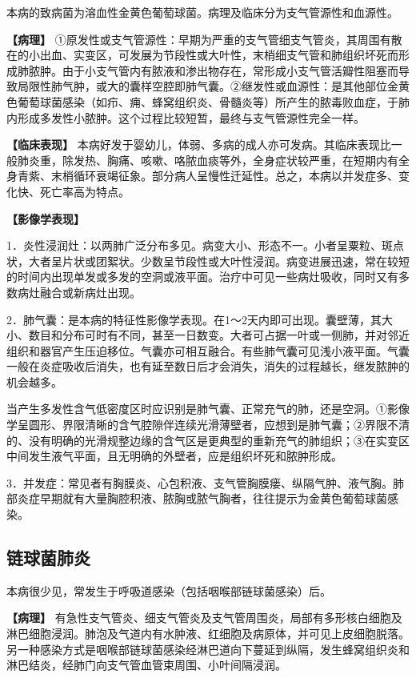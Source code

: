 本病的致病菌为溶血性金黄色葡萄球菌。病理及临床分为支气管源性和血源性。

\textbf{【病理】}
①原发性或支气管源性：早期为严重的支气管细支气管炎，其周围有散在的小出血、实变区，可发展为节段性或大叶性，末梢细支气管和肺组织坏死而形成肺脓肿。由于小支气管内有脓液和渗出物存在，常形成小支气管活瓣性阻塞而导致局限性肺气肿，或大的囊样空腔即肺气囊。②继发性或血源性：是其他部位金黄色葡萄球菌感染（如疖、痈、蜂窝组织炎、骨髓炎等）所产生的脓毒败血症，于肺内形成多发性小脓肿。这个过程比较短暂，最终与支气管源性完全一样。

\textbf{【临床表现】}
本病好发于婴幼儿，体弱、多病的成人亦可发病。其临床表现比一般肺炎重，除发热、胸痛、咳嗽、咯脓血痰等外，全身症状较严重，在短期内有全身青紫、末梢循环衰竭征象。部分病人呈慢性迁延性。总之，本病以并发症多、变化快、死亡率高为特点。

\textbf{【影像学表现】}

1．炎性浸润灶：以两肺广泛分布多见。病变大小、形态不一。小者呈粟粒、斑点状，大者呈片状或团絮状。少数呈节段性或大叶性浸润。病变进展迅速，常在较短的时间内出现单发或多发的空洞或液平面。治疗中可见一些病灶吸收，同时又有多数病灶融合或新病灶出现。

2．肺气囊：是本病的特征性影像学表现。在1～2天内即可出现。囊壁薄，其大小、数目和分布可时有不同，甚至一日数变。大者可占据一叶或一侧肺，并对邻近组织和器官产生压迫移位。气囊亦可相互融合。有些肺气囊可见浅小液平面。气囊一般在炎症吸收后消失，也有延至数日后才会消失，消失的过程越长，继发脓肿的机会越多。

当产生多发性含气低密度区时应识别是肺气囊、正常充气的肺，还是空洞。①影像学呈圆形、界限清晰的含气腔隙伴连续光滑薄壁者，应想到是肺气囊；②界限不清的、没有明确的光滑规整边缘的含气区是更典型的重新充气的肺组织；③在实变区中间发生液气平面，且无明确的外壁者，应是组织坏死和脓肿形成。

3．并发症：常见者有胸膜炎、心包积液、支气管胸膜瘘、纵隔气肿、液气胸。肺部炎症早期就有大量胸腔积液、脓胸或脓气胸者，往往提示为金黄色葡萄球菌感染。

\subsection{链球菌肺炎}

本病很少见，常发生于呼吸道感染（包括咽喉部链球菌感染）后。

\textbf{【病理】}
有急性支气管炎、细支气管炎及支气管周围炎，局部有多形核白细胞及淋巴细胞浸润。肺泡及气道内有水肿液、红细胞及病原体，并可见上皮细胞脱落。另一种感染方式是咽喉部链球菌感染经淋巴道向下蔓延到纵隔，发生蜂窝组织炎和淋巴结炎，经肺门向支气管血管束周围、小叶间隔浸润。

